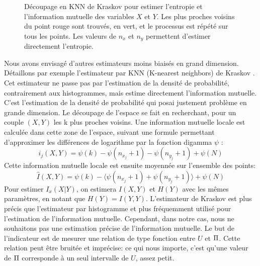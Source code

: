 \begin{figure}
\begin{minipage}{0.4\textwidth}
        \caption{Découpage en KNN de Kraskov pour estimer l'entropie et l'information mutuelle des variables $X$ et $Y$. Les plus proches voisins du point rouge sont trouvés, en vert, et le processus est répété sur tous les points. Les valeurs de $n_x$ et $n_y$ permettent d'estimer directement l'entropie.}
        \label{fig:kraskov}
\end{minipage}
\end{figure}

Nous avons envisagé d'autres estimateurs moins biaisés en grand dimension. Détaillons par exemple l'estimateur par KNN (K-nearest neighbors) de Kraskov \cite{2004kraskov}. 
Cet estimateur ne passe pas par l'estimation de la densité de probabilité, contrairement aux histogrammes, mais estime directement l'information mutuelle. C'est l'estimation de la densité de probabilité qui posai justement problème en grande dimension.
Le découpage de l'espace se fait en recherchant, pour un couple $(X,Y)$ les k plus proches voisins. Une information mutuelle locale est calculée dans cette zone de l'espace, suivant une formule permettant d'approximer les différences de logarithme par la fonction digamma $\psi$ : 
$$i_j(X,Y) = \psi(k) - \psi(n_{x_j} + 1) - \psi(n_{y_j} +1) + \psi(N)$$
Cette information mutuelle locale est ensuite moyennée sur l'ensemble des points: 
$$\hat{I}(X,Y) = \psi(k) - \langle\psi(n_{x_j} + 1) + \psi(n_{y_j} +1)\rangle + \psi(N)$$
Pour estimer $I_x(X|Y)$, on estimera $I(X,Y)$ et $H(Y)$ avec les mêmes paramètres, en notant que $H(Y) = I(Y,Y)$.
L'estimateur de Kraskov est plus précis que l'estimateur par histogramme et plus fréquemment utilisé pour l'estimation de l'information mutuelle. Cependant, dans notre cas, nous ne souhaitons pas une estimation précise de l'information mutuelle.
Le but de l'indicateur est de mesurer une relation de type fonction entre $U$ et $\Pi$.
Cette relation peut être bruitée et imprécise: ce qui nous importe, c'est qu'une valeur de $\Pi$ corresponde à un seul intervalle de $U$, assez petit.



